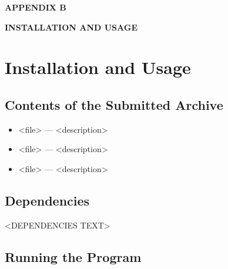
\begin{center}
\vspace*{60pt}

{\fontsize{18pt}{0pt} \MakeUppercase{\textbf{%
    Appendix B
    }}}
\vspace*{24pt}

{\fontsize{18pt}{0pt} \MakeUppercase{\textbf{%
    Installation and Usage
    }}}

\vspace*{100pt}
\end{center}
\thispagestyle{empty}


\chapter{Installation and Usage}
\label{app:usage}

\section{Contents of the Submitted Archive}
\label{app:archive}


\begin{itemize}
  \item <file> --- <description>
  \item <file> --- <description>
  \item <file> --- <description>
\end{itemize}

\section{Dependencies}
\label{app:deps}


<DEPENDENCIES TEXT>

\section{Running the Program}
\label{app:run}

